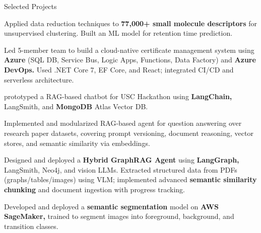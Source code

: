 \begin{cventries}
\vspace*{0.2cm}

\cventry
    {}
    {Selected Projects}
    {}
    {}
    {
        \begin{cvitemsfree}
            \item{Applied data reduction techniques to \textbf{77,000+ small molecule descriptors} for unsupervised clustering. Built an ML model for retention time prediction.}  %
            \item{Led 5-member team to build a cloud-native certificate management system using \textbf{Azure} (SQL DB, Service Bus, Logic Apps, Functions, Data Factory) and \textbf{Azure DevOps.} Used .NET Core 7, EF Core, and React; integrated CI/CD and serverless architecture.}
            \item{prototyped a RAG-based chatbot for USC Hackathon using \textbf{LangChain,} LangSmith, and \textbf{MongoDB} Atlas Vector DB.}
            \item{Implemented and modularized RAG-based agent for question answering over research paper datasets, covering prompt versioning, document reasoning, vector stores, and semantic similarity via embeddings.}
            \item{Designed and deployed a \textbf{Hybrid GraphRAG Agent} using \textbf{LangGraph,} LangSmith, Neo4j, and vision LLMs. Extracted structured data from PDFs (graphs/tables/images) using VLM; implemented advanced \textbf{semantic similarity chunking} and document ingestion with progress tracking.}
            \item{Developed and deployed a \textbf{semantic segmentation} model on \textbf{AWS SageMaker,} trained to segment images into foreground, background, and transition classes.}

\end{cvitemsfree}}
\end{cventries}
